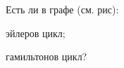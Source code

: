 Есть ли в графе  (см. рис):
\begin{enumcyr}
    \item эйлеров цикл;
    \item гамильтонов цикл?
\end{enumcyr}